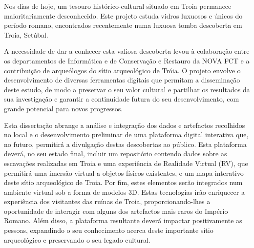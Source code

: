 
%

Nos dias de hoje, um tesouro histórico-cultural situado em Troia permanece maioritariamente desconhecido.  
Este projeto estuda vidros luxuosos e únicos do período romano, encontrados recentemente numa luxuosa tomba descoberta em Troia, Setúbal.


A necessidade de dar a conhecer esta valiosa descoberta levou à colaboração entre os departamentos de Informática e de Conservação e Restauro da NOVA FCT e a contribuição de arqueólogos do sítio arqueológico de Tróia. O projeto envolve o desenvolvimento de diversas ferramentas digitais que permitam a disseminação deste estudo, de modo a preservar o seu valor cultural e partilhar os resultados da sua investigação
e garantir a continuidade futura do seu desenvolvimento, com grande potencial para novos progressos.

Esta dissertação abrange a análise e integração dos dados e artefactos recolhidos no local e o desenvolvimento preliminar de uma plataforma digital interativa que, no futuro, permitirá a divulgação destas descobertas ao público.
Esta plataforma deverá, no seu estado final, incluir um repositório contendo dados sobre as escavações realizadas em Troia e uma experiência de Realidade Virtual (RV), que permitirá uma imersão virtual a objetos físicos existentes, e um mapa interativo deste sítio arqueológico de Troia. 
Por fim, estes elementos serão integrados num ambiente virtual sob a forma de modelos 3D.
Estas tecnologias irão enriquecer a experiência dos visitantes das ruínas de Troia, proporcionando-lhes a oportunidade de interagir com alguns dos artefactos mais raros do Império Romano. 
Além disso, a plataforma resultante deverá impactar positivamente as pessoas, expandindo o seu conhecimento acerca deste importante sítio arqueológico e preservando o seu legado cultural.


